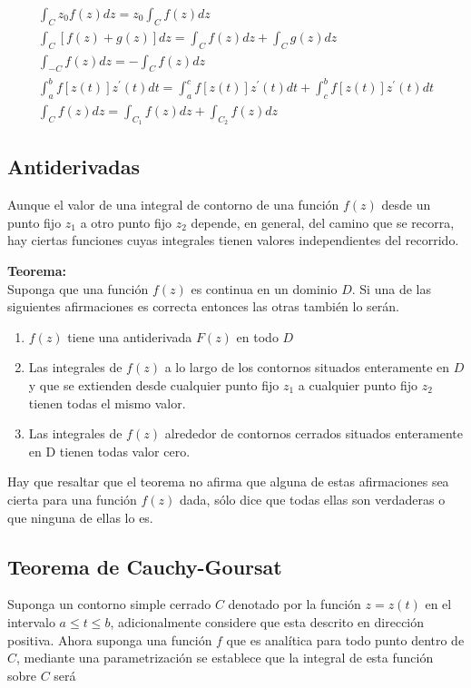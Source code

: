 \begin{gather*}
    \int_C z_0f(z)dz = z_0\int_C f(z)dz\\
    \int_C [f(z) + g(z)]dz = \int_C f(z)dz + \int_C  g(z)dz\\
    \int_{-C} f(z)dz = -\int_C f(z)dz\\
    \int_{a}^{b}f[z(t)]z^{\prime}(t)dt = \int_{a}^{c}f[z(t)]z^{\prime}(t)dt + \int_{c}^{b}f[z(t)]z^{\prime}(t)dt \\
    \int_{C}f(z)dz = \int_{C_1}f(z)dz + \int_{C_2}f(z)dz
\end{gather*}

\subsection{Antiderivadas}

Aunque el valor de una integral de contorno de una función $f(z)$ desde un punto fijo $z_1$ a otro punto fijo $z_2$ depende, en general, del camino que se recorra, hay ciertas funciones cuyas integrales tienen valores independientes del recorrido.

\begin{mdframed}
    \textbf{Teorema:}\\
Suponga que una función $f(z)$ es continua en un dominio $D$. Si una de las siguientes afirmaciones es correcta entonces las otras también lo serán.

\begin{enumerate}
    \item $f(z)$ tiene una antiderivada $F(z)$ en todo $D$
    \item Las integrales de $f(z)$ a lo largo de los contornos situados enteramente en $D$ y que se extienden desde cualquier punto fijo $z_1$ a cualquier punto fijo $z_2$ tienen todas el mismo valor.
    \item Las integrales de $f(z)$ alrededor de contornos cerrados situados enteramente en D tienen todas valor cero.
\end{enumerate}
\end{mdframed}
Hay que resaltar que el teorema no afirma que alguna de estas afirmaciones sea cierta para una función $f(z)$ dada, sólo dice que todas ellas son verdaderas o que ninguna de ellas lo es.

\subsection{Teorema de Cauchy-Goursat}

Suponga un contorno simple cerrado $C$ denotado por la función $z = z(t)$ en el intervalo  $a \leq t \leq b$, adicionalmente considere que esta descrito en dirección positiva. Ahora suponga una función $f$ que es analítica para todo punto dentro de $C$, mediante una parametrización se establece que la integral de esta función sobre $C$ será 

